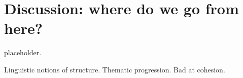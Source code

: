 \chapter[Discussion]{\label{chap:discussion} Discussion: where do we go from here?}
placeholder.


Linguistic notions of structure.
Thematic progression.
Bad at cohesion.
